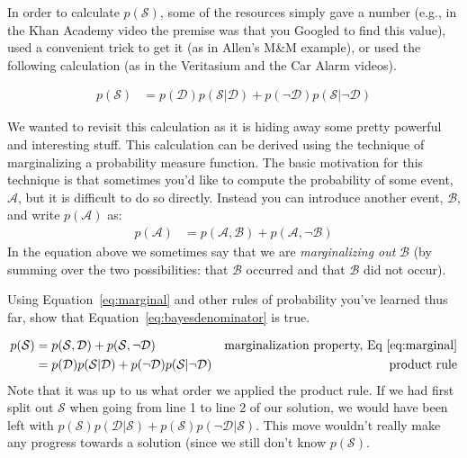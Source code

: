 \documentclass[assignment01_Solutions]{subfiles}
\begin{document}
In order to calculate $p(\mathcal{S})$, some of the resources simply gave a number (e.g., in the Khan Academy video the premise was that you Googled to find this value), used a convenient trick to get it (as in Allen's M\&M example), or used the following calculation (as in the Veritasium and the Car Alarm videos).

\begin{align}
p(\mathcal{S}) &= p(\mathcal{D}) p(\mathcal{S}|\mathcal{D}) + p(\neg \mathcal{D}) p(\mathcal{S} | \neg \mathcal{D})
\end{align}

We wanted to revisit this calculation as it is hiding away some pretty powerful and interesting stuff.  This calculation can be derived using the technique of marginalizing a probability measure function.  The basic motivation for this technique is that sometimes you'd like to compute the probability of some event, $\mathcal{A}$, but it is difficult to do so directly.  Instead you can introduce another event, $\mathcal{B}$, and write $p(\mathcal{A})$ as:
\begin{align}
p(\mathcal{A}) &= p(\mathcal{A}, \mathcal{B}) + p(\mathcal{A}, \neg \mathcal{B}) \label{eq:marginal}
\end{align}
In the equation above we sometimes say that we are \emph{marginalizing out} $\mathcal{B}$ (by summing over the two possibilities: that $\mathcal{B}$ occurred and that $\mathcal{B}$ did not occur).

\begin{exercise}[(15 minutes)]
Using Equation~\ref{eq:marginal} and other rules of probability you've learned thus far, show that Equation~\ref{eq:bayesdenominator} is true.

\begin{boxedsolution}
\begin{align}
p(\mathcal{S}) &= p(\mathcal{S}, \mathcal{D}) + p(\mathcal{S}, \neg \mathcal{D}) & \mbox{marginalization property, Eq~\ref{eq:marginal}} \nonumber \\
&= p(\mathcal{D})p(\mathcal{S}|\mathcal{D}) + p(\neg \mathcal{D}) p(\mathcal{S} | \neg \mathcal{D})& \mbox{product rule} \nonumber
\end{align}
Note that it was up to us what order we applied the product rule.  If we had first split out $\mathcal{S}$ when going from line 1 to line 2 of our solution, we would have been left with $p(\mathcal{S})p(\mathcal{D}|\mathcal{S}) + p(\mathcal{S}) p(\neg \mathcal{D} | \mathcal{S})$.  This move wouldn't really make any progress towards a solution (since we still don't know $p(\mathcal{S})$.

\end{boxedsolution}
\end{exercise}
\end{document}
